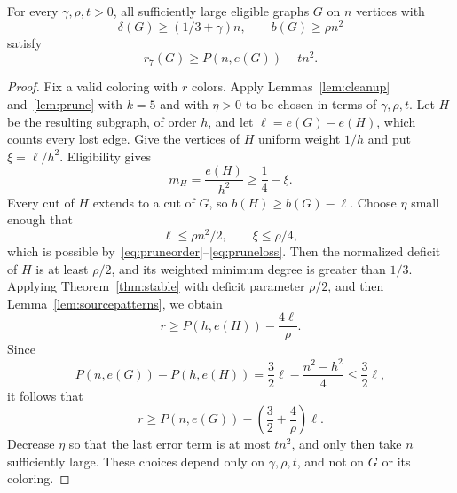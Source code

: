 \begin{proposition}\label{prop:farcut}
For every $\gamma,\rho,t>0$, all sufficiently large eligible graphs $G$ on $n$ vertices with
\[
 \delta(G)\ge(1/3+\gamma)n,\qquad b(G)\ge\rho n^2
\]
satisfy
\begin{equation}\label{eq:farcut}
 r_7(G)\ge P(n,e(G))-tn^2.
\end{equation}
\end{proposition}
\begin{proof}
Fix a valid coloring with $r$ colors. Apply Lemmas~\ref{lem:cleanup} and~\ref{lem:prune} with $k=5$ and with $\eta>0$ to be chosen in terms of $\gamma,\rho,t$. Let $H$ be the resulting subgraph, of order $h$, and let $\ell=e(G)-e(H)$, which counts every lost edge. Give the vertices of $H$ uniform weight $1/h$ and put $\xi=\ell/h^2$. Eligibility gives
\[
 m_H=\frac{e(H)}{h^2}\ge\frac14-\xi.
\]
Every cut of $H$ extends to a cut of $G$, so $b(H)\ge b(G)-\ell$. Choose $\eta$ small enough that
\[
 \ell\le\rho n^2/2,\qquad \xi\le\rho/4,
\]
which is possible by~\eqref{eq:pruneorder}--\eqref{eq:pruneloss}. Then the normalized deficit of $H$ is at least $\rho/2$, and its weighted minimum degree is greater than $1/3$. Applying Theorem~\ref{thm:stable} with deficit parameter $\rho/2$, and then Lemma~\ref{lem:sourcepatterns}, we obtain
\[
 r\ge P(h,e(H))-\frac{4\ell}{\rho}.
\]
Since
\[
 P(n,e(G))-P(h,e(H))
 =\frac32\ell-\frac{n^2-h^2}{4}\le\frac32\ell,
\]
it follows that
\begin{equation}\label{eq:sourceerror}
 r\ge P(n,e(G))-\left(\frac32+\frac4\rho\right)\ell.
\end{equation}
Decrease $\eta$ so that the last error term is at most $tn^2$, and only then take $n$ sufficiently large. These choices depend only on $\gamma,\rho,t$, and not on $G$ or its coloring.
\end{proof}
